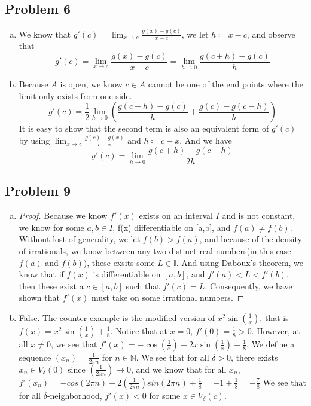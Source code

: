 \documentclass[12pt]{article}
\begin{document}
\subsection*{Problem 6}
\begin{enumerate}[a).]
    \item {
        We know that $g'(c) = \lim_{x \rightarrow c} \frac{g(x) - g(c)}{x - c}$, we let $h \coloneq x - c$, and observe that 
        $$g'(c) = \lim_{x \rightarrow c} \frac{g(x) - g(c)}{x - c} = \lim_{h \rightarrow 0} \frac{g(c+h) - g(c)}{h}$$
    }
    \item {
        Because $A$ is open, we know $c \in A$ cannot be one of the end points where the limit only exists from one-side. 
        $$g'(c) = \frac{1}{2} \lim_{h \rightarrow 0} (\frac{g(c+h) - g(c)}{h}+\frac{g(c) - g(c-h)}{h})$$
        It is easy to show that the second term is also an equivalent form of $g'(c)$ by using $\lim_{x\rightarrow c}\frac{g(c) - g(x)}{c-x}$ and $h \coloneq c-x$. 
        And we have
        $$g'(c) = \lim_{h \rightarrow 0} \frac{g(c+h) - g(c-h)}{2h}$$

    }
\end{enumerate}
\subsection*{Problem 9}
\begin{enumerate}[a).]
    \item {
        \begin{proof}
        Because we know $f'(x)$ exists on an interval $I$ and is not constant, we know for some $a, b \in I$, f(x) differentiable on [a,b], and $f(a) \ne f(b)$. 
        Without lost of generality, we let $f(b) > f(a)$, and because of the density of irrationals, we know between any two distinct real numbers(in this case $f(a)$ and $f(b)$), these exsits some $L \in \mathbb{I}$. 
        And using Daboux's theorem, we know that if $f(x)$ is differentiable on $[a,b]$, and $f'(a) < L < f'(b)$, then these exist a $c \in [a,b]$ such that $f'(c) = L$.
        Consequently, we have shown that $f'(x)$ must take on some irrational numbers. 
        \end{proof}
    }
    \item {
        False. 
        The counter example is the modified version of $x^2\sin(\frac{1}{x})$, that is $f(x) = x^2\sin(\frac{1}{x}) + \frac{1}{8}$. 
        Notice that at $x = 0$, $f'(0) = \frac{1}{8} > 0$. 
        However, at all $x \ne 0$, we see that $f'(x) = -\cos(\frac{1}{x}) + 2x\sin(\frac{1}{x}) + \frac{1}{8}$. 
        We define a sequence $(x_n) = \frac{1}{2\pi n}$ for $n \in \mathbb{N}$.
        We see that for all $\delta > 0$, there exists $x_n \in V_{\delta}(0)$ since $(\frac{1}{2\pi n}) \rightarrow 0$, and we know that for all $x_n$, $f'(x_n) = -cos(2 \pi n) + 2(\frac{1}{2 \pi n})sin(2\pi n) + \frac{1}{8} = -1 + \frac{1}{8} = -\frac{7}{8}$
        We see that for all $\delta$-neighborhood, $f'(x) < 0$ for some $x \in V_{\delta}(c)$. 
    }
\end{enumerate}
\end{document}
